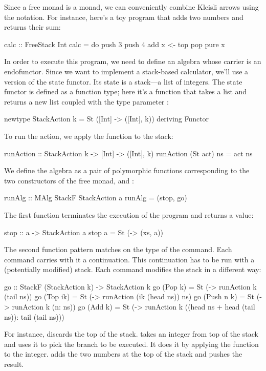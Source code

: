 \documentclass[DaoFP]{subfiles}
\begin{document}
Since a free monad is a monad, we can conveniently combine Kleisli arrows using the  notation. For instance, here's a toy program that adds two numbers and returns their sum:
\begin{haskell}
calc :: FreeStack Int
calc = do
  push 3
  push 4
  add
  x <- top
  pop
  pure x
\end{haskell}

In order to execute this program, we need to define an algebra whose carrier is an endofunctor. Since we want to implement a stack-based calculator, we'll use a version of the state functor. Its state is a stack---a list of integers. The state functor is defined as a function type; here it's a function that takes a list and returns a new list coupled with the type parameter :
\begin{haskell}
newtype StackAction k = St ([Int] -> ([Int], k))
  deriving Functor
\end{haskell}

To run the action, we apply the function to the stack:
\begin{haskell}
runAction :: StackAction k -> [Int] -> ([Int], k)
runAction (St act) ns = act ns
\end{haskell}

We define the algebra as a pair of polymorphic functions corresponding to the two constructors of the free monad,  and :
\begin{haskell}
runAlg :: MAlg StackF StackAction a
runAlg = (stop, go)
\end{haskell}
The first function terminates the execution of the program and returns a value:
\begin{haskell}
stop :: a -> StackAction a
stop a = St (\xs -> (xs, a))
\end{haskell}
The second function pattern matches on the type of the command. Each command carries with it a continuation. This continuation has to be run with a (potentially modified) stack. Each command modifies the stack in a different way:
\begin{haskell}
go :: StackF (StackAction k) -> StackAction k
go (Pop k)    = St (\ns -> runAction k (tail ns))
go (Top ik)   = St (\ns -> runAction (ik (head ns)) ns)
go (Push n k) = St (\ns -> runAction k (n: ns))
go (Add k)    = St (\ns -> runAction k 
                   ((head ns + head (tail ns)): tail (tail ns)))
\end{haskell}
For instance,  discards the top of the stack.  takes an integer from top of the stack and uses it to pick the branch to be executed. It does it by applying the function  to the integer.  adds the two numbers at the top of the stack and pushes the result. 
\end{document}
